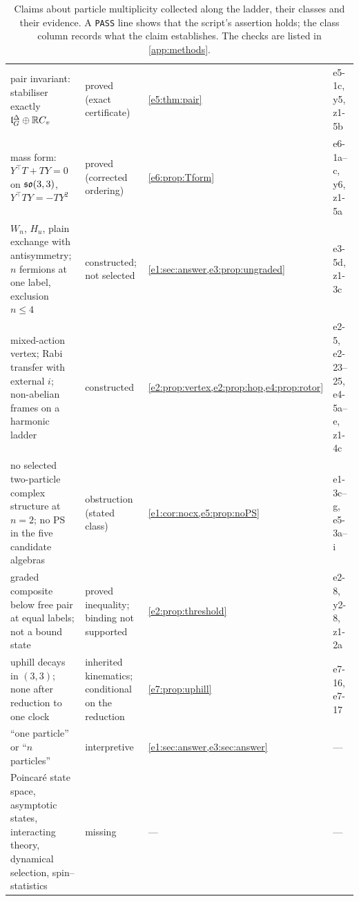 \begin{table}[!htbp]
\begin{tabular}{@{}>{\raggedright\arraybackslash}p{6.1cm}>{\raggedright\arraybackslash}p{2.4cm}>{\raggedright\arraybackslash}p{3.0cm}>{\raggedright\arraybackslash}p{3.0cm}@{}}
pair invariant: stabiliser exactly $\mathfrak l_G^\Delta\oplus\mathbb{R} C_v$ & proved (exact certificate) & \cref{e5:thm:pair} & e5-1c, y5, z1-5b\\
mass form: $Y^{\!\top}T+TY=0$ on $\mathfrak{so}(3,3)$, $Y^{\!\top}TY=-TY^2$ & proved (corrected ordering) & \cref{e6:prop:Tform} & e6-1a--c, y6, z1-5a\\
$W_n$, $H_u$, plain exchange with antisymmetry; $n$ fermions at one label, exclusion $n\le4$ & constructed; not selected & \cref{e1:sec:answer,e3:prop:ungraded} & e3-5d, z1-3c\\
mixed-action vertex; Rabi transfer with external $i$; non-abelian frames on a harmonic ladder & constructed & \cref{e2:prop:vertex,e2:prop:hop,e4:prop:rotor} & e2-5, e2-23--25, e4-5a--e, z1-4c\\
no selected two-particle complex structure at $n=2$; no PS in the five candidate algebras & obstruction (stated class) & \cref{e1:cor:nocx,e5:prop:noPS} & e1-3c--g, e5-3a--i\\
graded composite below free pair at equal labels; not a bound state & proved inequality; binding not supported & \cref{e2:prop:threshold} & e2-8, y2-8, z1-2a\\
uphill decays in $(3,3)$; none after reduction to one clock & inherited kinematics; conditional on the reduction & \cref{e7:prop:uphill} & e7-16, e7-17\\
``one particle'' or ``$n$ particles'' & interpretive & \cref{e1:sec:answer,e3:sec:answer} & ---\\
Poincar\'e state space, asymptotic states, interacting theory, dynamical selection, spin--statistics & missing & --- & ---\\
\bottomrule
\end{tabular}
\caption{Claims about particle multiplicity collected along the ladder, their classes and their evidence. A \texttt{PASS} line shows that the script's
assertion holds; the class column records what the claim establishes. The checks are listed in \cref{app:methods}.}
\label{e8:tab:claims}
\end{table}

